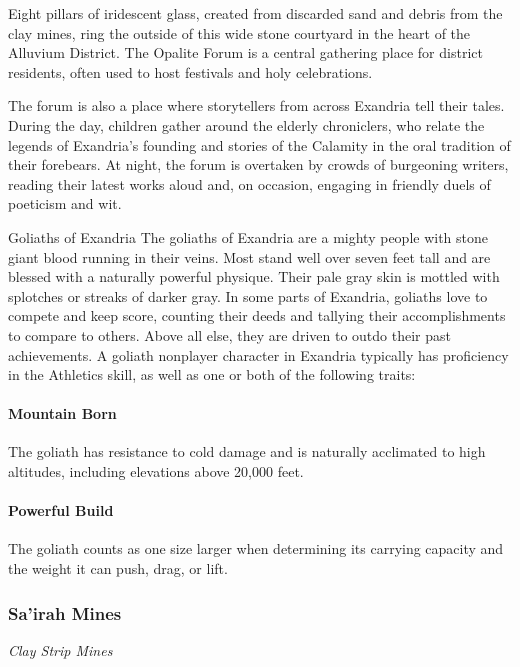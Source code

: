 \documentclass[a4paper, 11pt, bg=full, twocolumn, nooutline]{dndbook}
\begin{document}
Eight pillars of iridescent glass, created from discarded sand and debris from the clay mines, ring the outside of this wide stone courtyard in the heart of the Alluvium District. The Opalite Forum is a central gathering place for district residents, often used to host festivals and holy celebrations.

The forum is also a place where storytellers from across Exandria tell their tales. During the day, children gather around the elderly chroniclers, who relate the legends of Exandria's founding and stories of the Calamity in the oral tradition of their forebears. At night, the forum is overtaken by crowds of burgeoning writers, reading their latest works aloud and, on occasion, engaging in friendly duels of poeticism and wit.


\begin{DndSidebar}{Goliaths of Exandria}
The goliaths of Exandria are a mighty people with stone giant blood running in their veins. Most stand well over seven feet tall and are blessed with a naturally powerful physique. Their pale gray skin is mottled with splotches or streaks of darker gray.
In some parts of Exandria, goliaths love to compete and keep score, counting their deeds and tallying their accomplishments to compare to others. Above all else, they are driven to outdo their past achievements.
A goliath nonplayer character in Exandria typically has proficiency in the Athletics skill, as well as one or both of the following traits:
\paragraph{Mountain Born}

The goliath has resistance to cold damage and is naturally acclimated to high altitudes, including elevations above 20,000 feet.
\paragraph{Powerful Build}

The goliath counts as one size larger when determining its carrying capacity and the weight it can push, drag, or lift.
\end{DndSidebar}

\subsubsection{Sa'irah Mines}

\textit{Clay Strip Mines}
\end{document}
